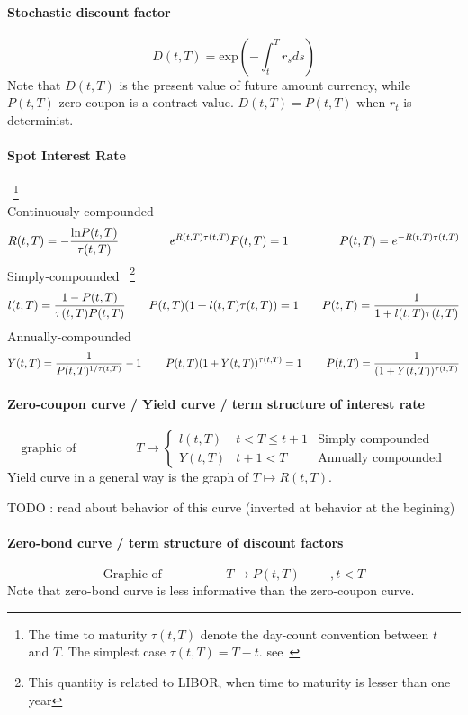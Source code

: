 \documentclass[a4paper,10pt]{article}
\newcommand{\RtT}{R(t,T)}
\newcommand{\PtT}{P(t,T)}
\newcommand{\LtT}{l(t,T)}
\newcommand{\YtT}{Y(t,T)}
\newcommand{\tautT}{\tau(t,T)}
\newcommand{\inttT}{\int_t^T}
\newcommand{\FuncExp}{\text{exp}}
\newcommand{\FuncLn}{\text{ln}}
\newcommand{\todo}[1]{\begin{center}\color{red} TODO : #1\end{center}}
\begin{document}
\paragraph{Stochastic discount factor} 
\[
D(t,T) = \FuncExp\left( -\inttT r_s ds \right)
\]
Note that $D(t,T)$ is the present value of future amount currency, while $\PtT$ zero-coupon is a contract value. $D(t,T)=\PtT$ when $r_t$ is determinist.
\paragraph{Spot Interest Rate}~\footnote{The time to maturity $\tautT$ denote the day-count convention between $t$ and $T$. The simplest case $\tautT=T-t$. see~\cite{PICARDO2014} }\\
Continuously-compounded 
\[
R(t,T) = -\frac{\FuncLn\PtT }{\tautT}
\hspace{1.5cm}
e^{\RtT\tautT}\PtT = 1
\hspace{1.5cm}
\PtT = e^{-\RtT\tautT}
\]
Simply-compounded ~\footnote{This quantity is related to LIBOR, when time to maturity is lesser than one year} 
\[
\LtT = \frac{1-\PtT}{\tautT\PtT}
\hspace{0.7 cm}
\PtT(1+\LtT\tautT)=1
\hspace{0.7cm}
\PtT = \frac{1}{1+\LtT\tautT}
\]
Annually-compounded
\[
\YtT = \frac{1}{\PtT^{1/\tautT}} -1
\hspace{0.8cm}
\PtT(1+\YtT)^{\tautT} = 1
\hspace{0.8cm}
\PtT = \frac{1}{(1+\YtT)^{\tautT}}
\]

\paragraph{Zero-coupon curve / Yield curve / term structure of interest rate}
\[
\text{graphic of}
\hspace{2cm}
T \longmapsto
\left\{
\begin{array}{lll}
\LtT  &  t < T \leq t+1 & \text{Simply compounded} \\
\YtT  &  t+1 < T        & \text{Annually compounded} 
\end{array}
\right.
\]
Yield curve in a general way is the graph of $T \longmapsto \RtT$.
\todo{read about behavior of this curve (inverted at behavior at the begining)}
\paragraph{Zero-bond curve / term structure of discount factors}
\[
\text{Graphic of }
\hspace{2cm}
T \longmapsto \PtT
\hspace{1cm}
,t<T
\]
Note that zero-bond curve is less informative than the zero-coupon curve.
\end{document}

